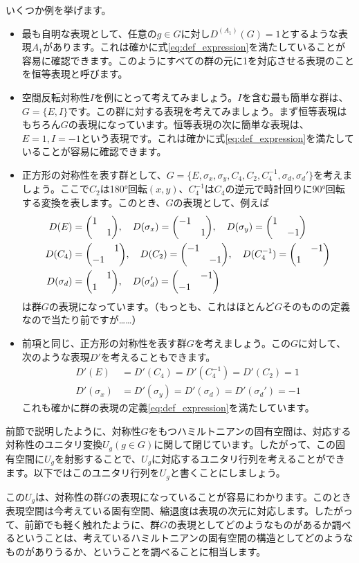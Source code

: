 \documentclass[uplatex,dvipdfmx,a4j,openany]{jsarticle}
\begin{document}
いくつか例を挙げます。
\begin{itemize}
	\item 最も自明な表現として、任意の$g\in G$に対し$D^{(A_1)}(G) = 1$とするような表現$A_1$があります。これは確かに式\eqref{eq:def_expression}を満たしていることが容易に確認できます。このようにすべての群の元に1を対応させる表現のことを恒等表現と呼びます。
	\item 空間反転対称性$I$を例にとって考えてみましょう。$I$を含む最も簡単な群は、$G = \{E,I\}$です。この群に対する表現を考えてみましょう。まず恒等表現はもちろん$G$の表現になっています。恒等表現の次に簡単な表現は、$E=1, I=-1$という表現です。これは確かに式\eqref{eq:def_expression}を満たしていることが容易に確認できます。
	\item 正方形の対称性を表す群として、$G = \{ E, \sigma_x, \sigma_y, C_4, C_2, C_4^{-1}, \sigma_d, \sigma_d'\}$を考えましょう。ここで$C_2$は180°回転$(x,y)$、$C_4^{-1}$は$C_4$の逆元で時計回りに90°回転する変換を表します。このとき、$G$の表現として、例えば\begin{align}
		D(E) &= \mqty(\dmat{1,1}) \qc D(\sigma_x) = \mqty(\dmat{-1,1}) \qc D(\sigma_y) = \mqty(\dmat{1,-1}) \\
		D(C_4) &= \mqty(\admat{1,-1}) \qc D(C_2) = \mqty(\dmat{-1,-1}) \qc D(C_4^{-1}) = \mqty(\admat{-1,1}) \\
		D(\sigma_d) &= \mqty(\admat{1,1}) \qc D(\sigma_d') = \mqty(\admat{-1,-1}) \label{eq:square_rep}
	\end{align}
	は群$G$の表現になっています。（もっとも、これはほとんど$G$そのものの定義なので当たり前ですが……）
	\item 前項と同じ、正方形の対称性を表す群$G$を考えましょう。この$G$に対して、次のような表現$D'$を考えることもできます。\begin{align}
		D'(E) &= D'(C_4) = D'(C_4^{-1}) = D'(C_2) = 1\\
		D'(\sigma_x) &= D'(\sigma_y) = D'(\sigma_d) = D'(\sigma_d') = -1
	\end{align}
	これも確かに群の表現の定義\eqref{eq:def_expression}を満たしています。
\end{itemize}

前節で説明したように、対称性$G$をもつハミルトニアンの固有空間は、対応する対称性のユニタリ変換$U_g(g\in G)$に関して閉じています。したがって、この固有空間に$U_g$を射影することで、$U_g$に対応するユニタリ行列を考えることができます。以下ではこのユニタリ行列を$U_g$と書くことにしましょう。

この$U_g$は、対称性の群$G$の表現になっていることが容易にわかります。このとき表現空間は今考えている固有空間、縮退度は表現の次元に対応します。したがって、前節でも軽く触れたように、群$G$の表現としてどのようなものがあるか調べるということは、考えているハミルトニアンの固有空間の構造としてどのようなものがありうるか、ということを調べることに相当します。
\end{document}
